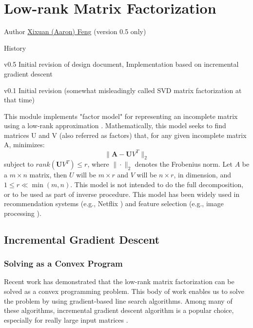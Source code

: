 
\chapter{Low-rank Matrix Factorization}

\begin{moduleinfo}
\item[Author] \href{mailto:xfeng@cs.wisc.edu}{Xixuan (Aaron) Feng} (version 0.5 only)
\item[History]
	\begin{modulehistory}
		\item[v0.5] Initial revision of design document, Implementation based on incremental gradient descent
		\item[v0.1] Initial revision (somewhat misleadingly called SVD matrix factorization at that time)
	\end{modulehistory}
\end{moduleinfo}

This module implements "factor model" for representing an incomplete matrix using a low-rank approximation \cite{DBLP:conf/icml/SrebroJ03}.
Mathematically, this model seeks to find matrices U and V (also referred as factors) that, for any given incomplete matrix A, minimizes:
\[ \|\boldsymbol A - \boldsymbol UV^{T} \|_2 \]
subject to $rank(\boldsymbol UV^{T}) \leq r$, where $\|\cdot\|_2$ denotes the Frobenius norm.
Let $A$ be a $m \times n$ matrix, then $U$ will be $m \times r$ and $V$ will be $n \times r$, in dimension, and $1 \leq r \ll \min(m, n)$.
This model is not intended to do the full decomposition, or to be used as part of inverse procedure.
This model has been widely used in recommendation systems (e.g., Netflix \cite{:TheNetflixPrize07}) and feature selection (e.g., image processing \cite{DBLP:conf/nips/WrightGRPM09}).

\section{Incremental Gradient Descent}

\subsection{Solving as a Convex Program}
Recent work \cite{DBLP:journals/cacm/CandesR12, DBLP:journals/siamrev/RechtFP10} has demonstrated that the low-rank matrix factorization can be solved as a convex programming problem.
This body of work enables us to solve the problem by using gradient-based line search algorithms.
Among many of these algorithms, incremental gradient descent algorithm is a popular choice, especially for really large input matrices \cite{DBLP:conf/sigmod/FengKRR12, DBLP:conf/kdd/GemullaNHS11}.

